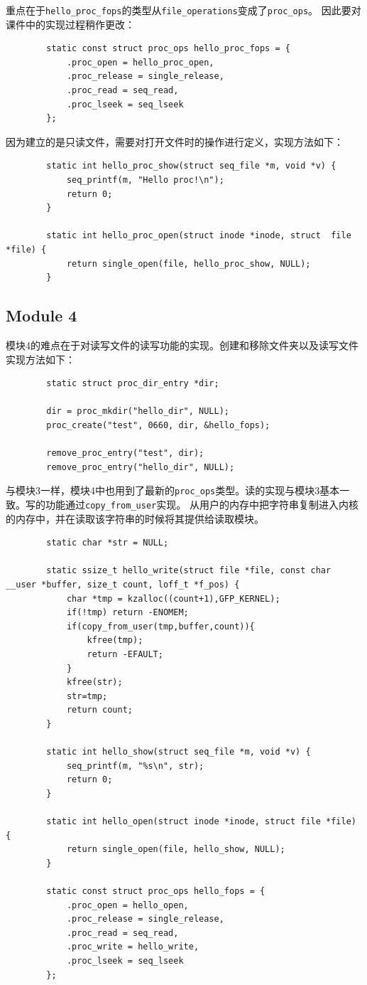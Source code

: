 \documentclass[UTF8]{ctexrep}
\begin{document}
    重点在于\lstinline{hello_proc_fops}的类型从\lstinline{file_operations}变成了\lstinline{proc_ops}。
    因此要对课件中的实现过程稍作更改：
    \begin{lstlisting}
        static const struct proc_ops hello_proc_fops = {
            .proc_open = hello_proc_open,
            .proc_release = single_release,
            .proc_read = seq_read,
            .proc_lseek = seq_lseek
        };
    \end{lstlisting}

    因为建立的是只读文件，需要对打开文件时的操作进行定义，实现方法如下：
    \begin{lstlisting}
        static int hello_proc_show(struct seq_file *m, void *v) {
            seq_printf(m, "Hello proc!\n");
            return 0;
        }

        static int hello_proc_open(struct inode *inode, struct  file *file) {
            return single_open(file, hello_proc_show, NULL);
        }
    \end{lstlisting}

    \subsection{Module 4}
    模块4的难点在于对读写文件的读写功能的实现。创建和移除文件夹以及读写文件实现方法如下：
    \begin{lstlisting}
        static struct proc_dir_entry *dir;

        dir = proc_mkdir("hello_dir", NULL);
        proc_create("test", 0660, dir, &hello_fops);

        remove_proc_entry("test", dir);
        remove_proc_entry("hello_dir", NULL);
    \end{lstlisting}

    与模块3一样，模块4中也用到了最新的\lstinline{proc_ops}类型。读的实现与模块3基本一致。写的功能通过\lstinline{copy_from_user}实现。
    从用户的内存中把字符串复制进入内核的内存中，并在读取该字符串的时候将其提供给读取模块。
    \begin{lstlisting}
        static char *str = NULL;

        static ssize_t hello_write(struct file *file, const char __user *buffer, size_t count, loff_t *f_pos) {
            char *tmp = kzalloc((count+1),GFP_KERNEL);
            if(!tmp) return -ENOMEM;
            if(copy_from_user(tmp,buffer,count)){
                kfree(tmp);
                return -EFAULT;
            }
            kfree(str);
            str=tmp;
            return count;
        }

        static int hello_show(struct seq_file *m, void *v) {
            seq_printf(m, "%s\n", str);
            return 0;
        }

        static int hello_open(struct inode *inode, struct file *file) {
            return single_open(file, hello_show, NULL);
        }

        static const struct proc_ops hello_fops = {
            .proc_open = hello_open,
            .proc_release = single_release,
            .proc_read = seq_read,
            .proc_write = hello_write,
            .proc_lseek = seq_lseek
        };
    \end{lstlisting}
\end{document}
